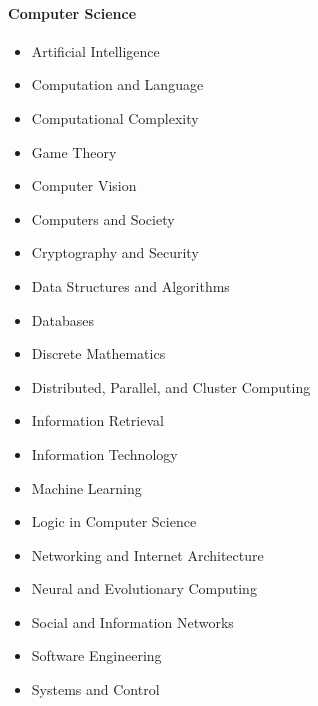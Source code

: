\paragraph{Computer Science}
\begin{itemize}
\setlength\itemsep{.0001em}
\item Artificial Intelligence
\item Computation and Language
\item Computational Complexity
\item Game Theory
\item Computer Vision
\item Computers and Society
\item Cryptography and Security
\item Data Structures and Algorithms
\item Databases
\item Discrete Mathematics
\item Distributed, Parallel, and Cluster Computing
\item Information Retrieval
\item Information Technology
\item Machine Learning
\item Logic in Computer Science
\item Networking and Internet Architecture
\item Neural and Evolutionary Computing
\item Social and Information Networks
\item Software Engineering
\item Systems and Control
\end{itemize}
